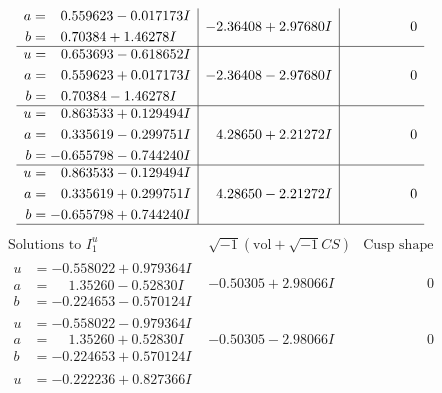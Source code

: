 \documentclass[1p]{elsarticle_modified}
\theoremstyle{definition}
\newcommand{\I}{\sqrt{-1}}
\begin{document}
$$\begin{array}{c|c|c}
\begin{aligned}
a &= \phantom{-}0.559623 - 0.017173 I \\
b &= \phantom{-}0.70384 + 1.46278 I\end{aligned}
 & -2.36408 + 2.97680 I & \phantom{-0.000000 } 0 \\ \hline\begin{aligned}
u &= \phantom{-}0.653693 - 0.618652 I \\
a &= \phantom{-}0.559623 + 0.017173 I \\
b &= \phantom{-}0.70384 - 1.46278 I\end{aligned}
 & -2.36408 - 2.97680 I & \phantom{-0.000000 } 0 \\ \hline\begin{aligned}
u &= \phantom{-}0.863533 + 0.129494 I \\
a &= \phantom{-}0.335619 - 0.299751 I \\
b &= -0.655798 - 0.744240 I\end{aligned}
 & \phantom{-}4.28650 + 2.21272 I & \phantom{-0.000000 } 0 \\ \hline\begin{aligned}
u &= \phantom{-}0.863533 - 0.129494 I \\
a &= \phantom{-}0.335619 + 0.299751 I \\
b &= -0.655798 + 0.744240 I\end{aligned}
 & \phantom{-}4.28650 - 2.21272 I & \phantom{-0.000000 } 0\\
 \hline 
 \end{array}$$\newpage$$\begin{array}{c|c|c}  
\text{Solutions to }I^u_{1}& \I (\text{vol} + \sqrt{-1}CS) & \text{Cusp shape}\\
 \hline 
\begin{aligned}
u &= -0.558022 + 0.979364 I \\
a &= \phantom{-}1.35260 - 0.52830 I \\
b &= -0.224653 - 0.570124 I\end{aligned}
 & -0.50305 + 2.98066 I & \phantom{-0.000000 } 0 \\ \hline\begin{aligned}
u &= -0.558022 - 0.979364 I \\
a &= \phantom{-}1.35260 + 0.52830 I \\
b &= -0.224653 + 0.570124 I\end{aligned}
 & -0.50305 - 2.98066 I & \phantom{-0.000000 } 0 \\ \hline\begin{aligned}
u &= -0.222236 + 0.827366 I \\

\end{aligned}
\end{array}$$
\end{document}
